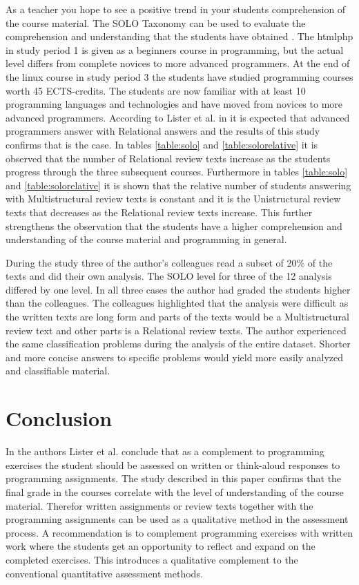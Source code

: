 \documentclass[twoside,twocolumn,a4paper,11pt,english]{article}
\begin{document}
As a teacher you hope to see a positive trend in your students comprehension of the course material. The SOLO Taxonomy can be used to evaluate the comprehension and understanding that the students have obtained \cite{biggs1982evaluation}. The htmlphp in study period 1 is given as a beginners course in programming, but the actual level differs from complete novices to more advanced programmers. At the end of the linux course in study period 3 the students have studied programming courses worth 45 ECTS-credits. The students are now familiar with at least 10 programming languages and technologies and have moved from novices to more advanced programmers. According to Lister et al. in \cite{lister2006not} it is expected that advanced programmers answer with Relational answers and the results of this study confirms that is the case. In tables \ref{table:solo} and \ref{table:solorelative} it is observed that the number of Relational review texts increase as the students progress through the three subsequent courses. Furthermore in tables \ref{table:solo} and \ref{table:solorelative} it is shown that the relative number of students answering with Multistructural review texts is constant and it is the Unistructural review texts that decreases as the Relational review texts increase. This further strengthens the observation that the students have a higher comprehension and understanding of the course material and programming in general.

During the study three of the author's colleagues read a subset of 20\% of the texts and did their own analysis. The SOLO level for three of the 12 analysis differed by one level. In all three cases the author had graded the students higher than the colleagues. The colleagues highlighted that the analysis were difficult as the written texts are long form and parts of the texts would be a Multistructural review text and other parts is a Relational review texts. The author experienced the same classification problems during the analysis of the entire dataset. Shorter and more concise answers to specific problems would yield more easily analyzed and classifiable material.




\section{Conclusion}

In \cite{lister2006not} the authors Lister et al. conclude that as a complement to programming exercises the student should be assessed on written or think-aloud responses to programming assignments. The study described in this paper confirms that the final grade in the courses correlate with the level of understanding of the course material. Therefor written assignments or review texts together with the programming assignments can be used as a qualitative method in the assessment process. A recommendation is to complement programming exercises with written work where the students get an opportunity to reflect and expand on the completed exercises. This introduces a qualitative complement to the conventional quantitative assessment methods.
\end{document}
